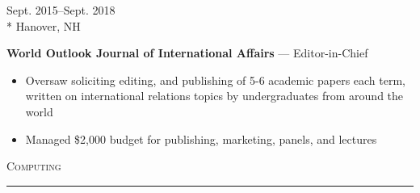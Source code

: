 \documentclass[a4paper,9pt]{article}
\begin{document}
\vspace{-3ex}
\begin{minipage}[t]{0.20\linewidth}
	\begin{small}
		\begin{spacing}{1.10}
			\begin{flushright}
				Sept. 2015--Sept. 2018
				\\*
				\vspace*{2.5pt}
				Hanover, NH
			\end{flushright}
		\end{spacing}
	\end{small}
\end{minipage}
\hspace{4mm}
\begin{minipage}[t]{0.75\linewidth}
	\begin{small}
		\begin{spacing}{1.00}
			\begin{flushleft}
				\textbf{World Outlook Journal of International Affairs} --- Editor-in-Chief
                \begin{itemize}[itemsep=0pt,topsep=2.5pt,leftmargin=*]
					\item Oversaw soliciting editing, and publishing of 5-6 academic papers each term, written on international relations
topics by undergraduates from around the world
					\item Managed \$2,000 budget for publishing, marketing, panels, and lectures
				\end{itemize}
			\end{flushleft}
		\end{spacing}
	\end{small}
\end{minipage}

\vspace{-6ex}
\vspace*{25pt}

\begin{Large}
	\textsc{Computing}
\end{Large}
\vspace*{5pt}
\hrule
\vspace*{5pt}
\end{document}
